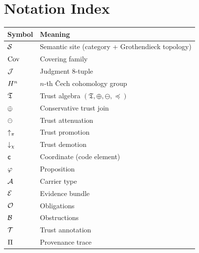 \documentclass[11pt]{article}
\begin{document}




\appendix
\section{Notation Index}
\begin{longtable}{lp{10cm}}
\toprule
\textbf{Symbol} & \textbf{Meaning} \\
\midrule
$\mathcal{S}$ & Semantic site (category + Grothendieck topology) \\
$\mathrm{Cov}$ & Covering family \\
$\mathcal{J}$ & Judgment 8-tuple \\
$H^{n}$ & $n$-th \v{C}ech cohomology group \\
$\mathfrak{T}$ & Trust algebra $(\mathfrak{T}, \oplus, \ominus, \preceq)$ \\
$\oplus$ & Conservative trust join \\
$\ominus$ & Trust attenuation \\
$\uparrow_\pi$ & Trust promotion \\
$\downarrow_\chi$ & Trust demotion \\
$\mathsf{c}$ & Coordinate (code element) \\
$\varphi$ & Proposition \\
$\mathcal{A}$ & Carrier type \\
$\mathcal{E}$ & Evidence bundle \\
$\mathcal{O}$ & Obligations \\
$\mathcal{B}$ & Obstructions \\
$\mathcal{T}$ & Trust annotation \\
$\Pi$ & Provenance trace \\
\bottomrule
\end{longtable}
\end{document}
